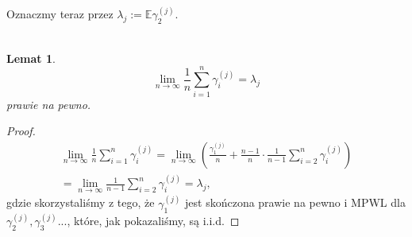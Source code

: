 \documentclass[a4paper]{article}
\theoremstyle{defn}
\theoremstyle{theorem}
\theoremstyle{lemma}
\newtheorem{lemma}[defn]{Lemat}
\theoremstyle{cor}
\theoremstyle{fact}
\begin{document}
Oznaczmy teraz przez $\lambda_j := \mathbb{E}\gamma_2^{(j)}$.\\\\
\begin{lemma}\label{lemma2.5.11}
$$\lim\limits_{n \to \infty} \frac{1}{n} \sum\limits_{i = 1}^n \gamma_i^{(j)} = \lambda_j$$
prawie na pewno.
\end{lemma}
\begin{proof}
\begin{align*}
    \lim\limits_{n \to \infty} \frac{1}{n} \sum\limits_{i = 1}^n \gamma_i^{(j)} =
    \lim\limits_{n \to \infty} \left(\frac{\gamma_1^{(j)}}{n} + \frac{n-1}{n}\cdot\frac{1}{n-1} \sum\limits_{i = 2}^n \gamma_i^{(j)}\right)\\
    = \lim\limits_{n \to \infty} \frac{1}{n-1} \sum\limits_{i = 2}^n \gamma_i^{(j)} = \lambda_j,
\end{align*}
gdzie skorzystaliśmy z tego, że $\gamma_1^{(j)}$ jest skończona prawie na pewno i MPWL dla $\gamma_2^{(j)}, \gamma_3^{(j)}...$, które, jak pokazaliśmy, są i.i.d.
\end{proof}
\end{document}

